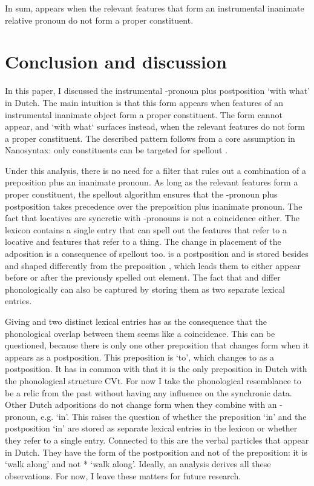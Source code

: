\documentclass[11pt,a4paper]{article}
\begin{document}
In sum,  appears when the relevant features that form an instrumental inanimate relative pronoun do not form a proper constituent.



\section{Conclusion and discussion}\label{sec:conclusion}

In this paper, I discussed the instrumental -pronoun plus postposition  `with what' in Dutch. The main intuition is that this form appears when features of an instrumental inanimate object form a proper constituent. The form cannot appear, and  `with what` surfaces instead, when the relevant features do not form a proper constituent. The described pattern follows from a core assumption in Nanosyntax: only constituents can be targeted for spellout \citep{starke2009}.

Under this analysis, there is no need for a filter that rules out a combination of a preposition plus an inanimate pronoun. As long as the relevant features form a proper constituent, the spellout algorithm ensures that the -pronoun plus postposition takes precedence over the preposition plus inanimate pronoun. The fact that locatives are syncretic with -pronouns is not a coincidence either. The lexicon contains a single entry that can spell out the features that refer to a locative and features that refer to a thing.
The change in placement of the adposition is a consequence of spellout too.  is a postposition and is stored besides and shaped differently from the preposition , which leads them to either appear before or after the previously spelled out element. The fact that  and  differ phonologically can also be captured by storing them as two separate lexical entries.

Giving  and  two distinct lexical entries has as the consequence that the phonological overlap between them seems like a coincidence. This can be questioned, because there is only one other preposition that changes form when it appears as a postposition. This preposition is  `to', which changes to  as a postposition. It has in common with  that it is the only preposition in Dutch with the phonological structure CVt. For now I take the phonological resemblance to be a relic from the past without having any influence on the synchronic data. Other Dutch adpositions do not change form when they combine with an -pronoun, e.g.  `in'. This raises the question of whether the preposition  `in' and the postposition  `in' are stored as separate lexical entries in the lexicon or whether they refer to a single entry. Connected to this are the verbal particles that appear in Dutch. They have the form of the postposition and not of the preposition: it is  `walk along' and not * `walk along'. Ideally, an analysis derives all these observations.
For now, I leave these matters for future research.
\end{document}
